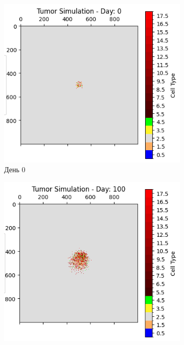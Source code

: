\documentclass{article}
\begin{document}
\begin{figure}[H]
    \centering
    \begin{subfigure}[t]{0.32\linewidth}
        \centering
        \includegraphics[width=\linewidth]{tumor_simulation_stats/tumor_day_0.png}
        \caption{День 0}
        \label{fig:tumor-day-0-no-immune}
    \end{subfigure}
    \hfill
    \begin{subfigure}[t]{0.32\linewidth}
        \centering
        \includegraphics[width=\linewidth]{tumor_simulation_stats/tumor_day_100.png}

\end{subfigure}
\end{figure}
\end{document}
